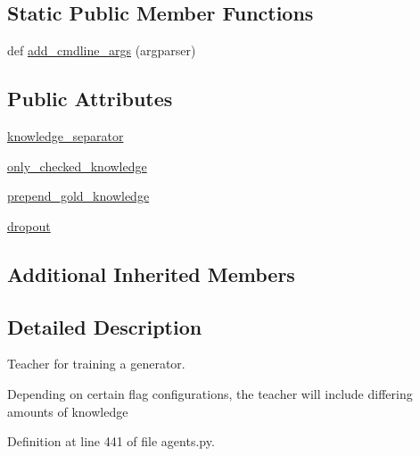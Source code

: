 \subsection*{Static Public Member Functions}
\begin{DoxyCompactItemize}
\item 
def \hyperlink{classparlai_1_1tasks_1_1wizard__of__wikipedia_1_1agents_1_1GeneratorTeacher_ae23cc01ce296734fbb1d23d8cb3ca81f}{add\+\_\+cmdline\+\_\+args} (argparser)
\end{DoxyCompactItemize}
\subsection*{Public Attributes}
\begin{DoxyCompactItemize}
\item 
\hyperlink{classparlai_1_1tasks_1_1wizard__of__wikipedia_1_1agents_1_1GeneratorTeacher_a4447c8875dd9f65e3d17ba2aec12d616}{knowledge\+\_\+separator}
\item 
\hyperlink{classparlai_1_1tasks_1_1wizard__of__wikipedia_1_1agents_1_1GeneratorTeacher_aafed07e065901daac67457e406e5dec0}{only\+\_\+checked\+\_\+knowledge}
\item 
\hyperlink{classparlai_1_1tasks_1_1wizard__of__wikipedia_1_1agents_1_1GeneratorTeacher_a83ff7bb3c705386f3b4e9ae07c0d04fe}{prepend\+\_\+gold\+\_\+knowledge}
\item 
\hyperlink{classparlai_1_1tasks_1_1wizard__of__wikipedia_1_1agents_1_1GeneratorTeacher_ab274137e75e9f6c5018376b4c61cdd32}{dropout}
\end{DoxyCompactItemize}
\subsection*{Additional Inherited Members}


\subsection{Detailed Description}
\begin{DoxyVerb}Teacher for training a generator.

Depending on certain flag configurations, the teacher will include differing amounts
of knowledge
\end{DoxyVerb}
 

Definition at line 441 of file agents.\+py.




